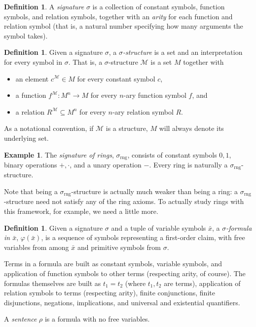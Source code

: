 \documentclass{article}
\theoremstyle{plain}
\theoremstyle{definition}
\newtheorem{defn}[thm]{Definition}
\newtheorem{example}[thm]{Example}
\newcommand{\defterm}{\emph}
\newcommand{\ringsig}{\sigma_{\operatorname{rng}}}
\newcommand{\tuple}{\bar}
\renewcommand{\phi}{\varphi}
\begin{document}
\begin{defn}
  A \defterm{signature} $\sigma$ is a collection of constant symbols,
  function symbols, and relation symbols, together with an
  \defterm{arity} for each function and relation symbol (that is, a
  natural number specifying how many arguments the symbol takes).
\end{defn}

\begin{defn}
  Given a signature $\sigma$, a \defterm{$\sigma$-structure} is a set
  and an interpretation for every symbol in $\sigma$. That is, a
  $\sigma$-structure $\mathcal{M}$ is a set $M$ together with
  \begin{itemize}
  \item an element $c^\mathcal{M} \in M$ for every constant symbol $c$,
  \item a function $f^\mathcal{M} : M^n \to M$ for every $n$-ary function symbol $f$, and
  \item a relation $R^\mathcal{M} \subseteq M^n$ for every $n$-ary relation symbol $R$.
  \end{itemize}
\end{defn}

As a notational convention, if $\mathcal{M}$ is a structure, $M$ will
always denote its underlying set.

\begin{example}
  The \defterm{signature of rings}, $\ringsig$, consists of constant
  symbols $0, 1$, binary operations $+, \cdot$, and a unary operation
  $-$. Every ring is naturally a $\ringsig$-structure.
\end{example}

Note that being a $\ringsig$-structure is actually much weaker than
being a ring: a $\ringsig$-structure need not satisfy any of the ring
axioms. To actually study rings with this framework, for example, we
need a little more.

\begin{defn}
  Given a signature $\sigma$ and a tuple of variable symbols
  $\tuple{x}$, a \defterm{$\sigma$-formula in $\tuple{x}$},
  $\phi(\tuple{x})$, is a sequence of symbols representing a
  first-order claim, with free variables from among $\tuple{x}$ and
  primitive symbols from $\sigma$.

  Terms in a formula are built as constant symbols, variable symbols,
  and application of function symbols to other terms (respecting
  arity, of course). The formulas themselves are built as $t_1 = t_2$
  (where $t_1, t_2$ are terms), application of relation symbols to
  terms (respecting arity), finite conjunctions, finite disjunctions,
  negations, implications, and universal and existential quantifiers.

  A \defterm{sentence} $\rho$ is a formula with no free variables.
\end{defn}
\end{document}
